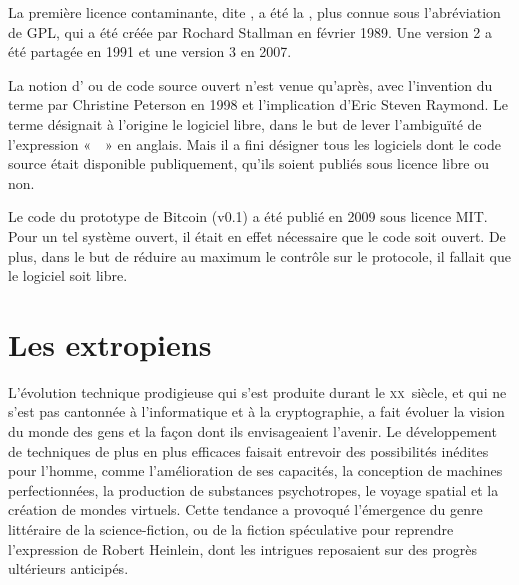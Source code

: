 La première licence contaminante, dite , a été la , plus connue sous l'abréviation de GPL, qui a été créée par Rochard Stallman en février 1989. Une version 2 a été partagée en 1991 et une version 3 en 2007.

La notion d' ou de code source ouvert n'est venue qu'après, avec l'invention du terme par Christine Peterson en 1998 et l'implication d'Eric Steven Raymond. Le terme désignait à l'origine le logiciel libre, dans le but de lever l'ambiguïté de l'expression «~~» en anglais. Mais il a fini désigner tous les logiciels dont le code source était disponible publiquement, qu'ils soient publiés sous licence libre ou non.

Le code du prototype de Bitcoin (v0.1) a été publié en 2009 sous licence MIT. Pour un tel système ouvert, il était en effet nécessaire que le code soit ouvert. De plus, dans le but de réduire au maximum le contrôle sur le protocole, il fallait que le logiciel soit libre.


\section*{Les extropiens}

L'évolution technique prodigieuse qui s'est produite durant le \textsc{xx}\ieme{}~siècle, et qui ne s'est pas cantonnée à l'informatique et à la cryptographie, a fait évoluer la vision du monde des gens et la façon dont ils envisageaient l'avenir. Le développement de techniques de plus en plus efficaces faisait entrevoir des possibilités inédites pour l'homme, comme l'amélioration de ses capacités, la conception de machines perfectionnées, la production de substances psychotropes, le voyage spatial et la création de mondes virtuels. Cette tendance a provoqué l'émergence du genre littéraire de la science-fiction, ou de la fiction spéculative pour reprendre l'expression de Robert Heinlein, dont les intrigues reposaient sur des progrès ultérieurs anticipés.


